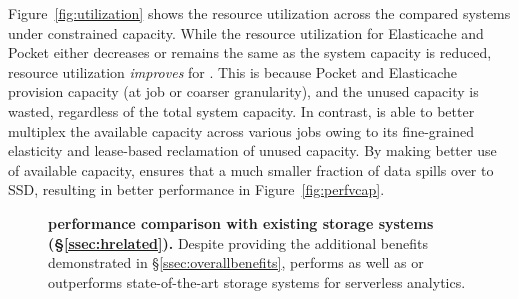 Figure~\ref{fig:utilization} shows the resource utilization across the compared systems under constrained capacity. While the resource utilization for Elasticache and Pocket either decreases or remains the same as the system capacity is reduced, resource utilization \textit{improves} for \jiffy. This is because Pocket and Elasticache provision capacity (at job or coarser granularity), and the unused capacity is wasted, regardless of the total system capacity. In contrast, \jiffy is able to better multiplex the available capacity across various jobs owing to its fine-grained elasticity and lease-based reclamation of unused capacity. By making better use of available capacity, \jiffy ensures that a much smaller fraction of data spills over to SSD, resulting in better performance in Figure~\ref{fig:perfvcap}.


\begin{figure}
  \centering
  \caption[\jiffy performance comparison with existing storage systems]{\small{\textbf{\jiffy performance comparison with existing storage systems (\S\ref{ssec:hrelated}).} Despite providing the additional benefits demonstrated in \S\ref{ssec:overallbenefits}, \jiffy performs as well as or outperforms state-of-the-art storage systems for serverless analytics.}}
  \label{fig:storage-perf}
\end{figure}

